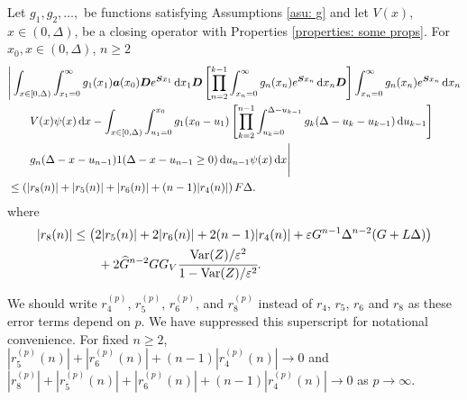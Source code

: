 \begin{cor}\label{cor: fljm7778}
	Let \(g_1,g_2,\dots,\) be functions satisfying Assumptions \ref{asu: g} and let \(V(x)\), \(x\in(0,\Delta)\), be a closing operator with Properties \ref{properties: some props}. For \(x_0,x\in(0,\Delta)\), \(n\geq 2\)
	\begin{align}
		&\Bigg| \int_{x\in[0,\Delta)} \int_{x_1=0}^\infty g_1(x_1) \boldsymbol a (x_0) \boldsymbol D e^{\boldsymbol{S}x_1}\, \mathrm{d} x_1\boldsymbol D 
            	\left[\prod_{n=2}^{k-1}\int_{x_n=0}^\infty g_n(x_n) e^{\boldsymbol{S}x_n} \, \mathrm{d} x_n
		\boldsymbol D\right]\int_{x_n=0}^\infty g_{n}(x_n) e^{\boldsymbol{S}x_n} \, \mathrm{d} x_n \nonumber 
            	\\&\qquad{}V(x) \psi(x)\, \mathrm{d} x - \int_{x\in[0,\Delta)} \int_{u_1=0}^{x_0}g_1(x_0 - u_1)
		\left[\prod_{k=2}^{n-1} \int_{u_k=0}^{\Delta-u_{k-1}} g_k(\Delta-u_k-u_{k-1})\, \mathrm{d} u_{k-1}\right] \nonumber 
            	\\&\qquad{} g_{n}(\Delta - x-u_{n-1}) 1(\Delta-x-u_{n-1}\geq0)\, \mathrm{d} u_{n-1}\psi(x)\, \mathrm{d} x \Bigg| \nonumber
		\\&\leq \left(|r_8(n)|+|r_5(n)|+|r_6(n)| + (n-1)|r_4(n)|\right)F\Delta.\label{eqn: KAFnnmna}
	\end{align}
	where 
	\begin{align*}
		|r_8(n)|&\leq  \left( 2|r_5(n)| + 2|r_6(n)| + 2(n-1)|r_4(n)| + \varepsilon G^{n-1}\Delta^{n-2}(G+L\Delta) \right) \\&\qquad{}+ 2\widehat G^{n-2}GG_V\cfrac{\mathrm{Var}(Z)/\varepsilon^2}{1-\mathrm{Var}(Z)/\varepsilon^2}.
	\end{align*}
\end{cor}
We should write \(r_4^{(p)}\), \(r_5^{(p)}\), \(r_6^{(p)}\), and \(r_8^{(p)}\) instead of \(r_4\), \(r_5\), \(r_6\) and \(r_8\) as these error terms depend on \(p\). We have suppressed this superscript for notational convenience. For fixed \(n\geq 2\), \( |r_5^{(p)}(n)| + |r_6^{(p)}(n)| + (n-1)|r_4^{(p)}(n)|\to 0\) and \( |r_8^{(p)}|+|r_5^{(p)}(n)| + |r_6^{(p)}(n)| + (n-1)|r_4^{(p)}(n)|\to 0\) as \(p\to \infty\). 

